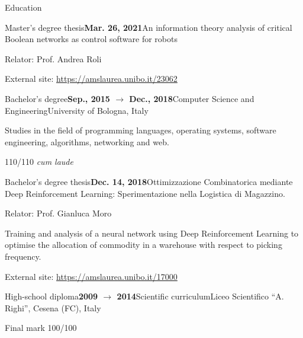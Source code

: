 \documentclass{resume} %
\begin{document}
\begin{rSection}{Education}
\begin{rSubsection}{Master's degree thesis}{\textbf{Mar. 26, 2021}}{An information theory analysis of critical Boolean networks as control software for robots}{\begin{flushright}
                    Relator: Prof. Andrea Roli
            \end{flushright}}
            \item External site: \url{https://amslaurea.unibo.it/23062}
        \end{rSubsection}
        \begin{rSubsection}{Bachelor's degree}{\textbf{Sep., 2015 $\rightarrow$ Dec., 2018}}{Computer Science and Engineering}{University of Bologna, Italy}
            \item Studies in the field of programming languages, operating systems, software engineering, algorithms, networking and web.
            \item 110/110 \emph{cum laude}
        \end{rSubsection}
        
        \begin{rSubsection}{Bachelor's degree thesis}{\textbf{Dec. 14, 2018}}{Ottimizzazione Combinatorica mediante Deep Reinforcement Learning: Sperimentazione nella Logistica di Magazzino.}{\begin{flushright}
                    Relator: Prof. Gianluca Moro
            \end{flushright}}
            \item Training and analysis of a neural network using Deep Reinforcement Learning to optimise the allocation of commodity in a warehouse with respect to picking frequency.
            
            \item External site: \url{https://amslaurea.unibo.it/17000}
        \end{rSubsection}
        
        \begin{rSubsection}{High-school diploma}{\textbf{2009 $\rightarrow$ 2014}}{Scientific curriculum}{Liceo Scientifico ``A. Righi'', Cesena (FC), Italy}
            \item Final mark 100/100
        \end{rSubsection}
        
    \end{rSection}
    
    
\end{document}
